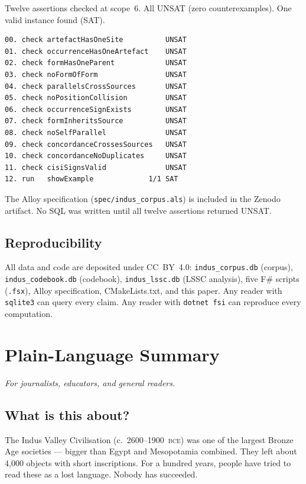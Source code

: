 Twelve assertions checked at scope~6. All UNSAT (zero
counterexamples). One valid instance found (SAT).

{\small
\begin{verbatim}
00. check artefactHasOneSite          UNSAT
01. check occurrenceHasOneArtefact    UNSAT
02. check formHasOneParent            UNSAT
03. check noFormOfForm                UNSAT
04. check parallelsCrossSources       UNSAT
05. check noPositionCollision         UNSAT
06. check occurrenceSignExists        UNSAT
07. check formInheritsSource          UNSAT
08. check noSelfParallel              UNSAT
09. check concordanceCrossesSources   UNSAT
10. check concordanceNoDuplicates     UNSAT
11. check cisiSignsValid              UNSAT
12. run   showExample             1/1 SAT
\end{verbatim}
}

\noindent
The Alloy specification (\texttt{spec/indus\_corpus.als}) is
included in the Zenodo artifact. No SQL was written until all
twelve assertions returned UNSAT.

\subsection{Reproducibility}

All data and code are deposited under CC~BY~4.0:
\texttt{indus\_corpus.db} (corpus),
\texttt{indus\_codebook.db} (codebook),
\texttt{indus\_lssc.db} (LSSC analysis),
five F\# scripts (\texttt{.fsx}),
Alloy specification, CMakeLists.txt,
and this paper.
Any reader with \texttt{sqlite3} can query every claim.
Any reader with \texttt{dotnet fsi} can reproduce every
computation.

\clearpage
\section{Plain-Language Summary}

\textit{For journalists, educators, and general readers.}

\subsection{What is this about?}

The Indus Valley Civilisation (c.\ 2600--1900~\textsc{bce}) was
one of the largest Bronze Age societies --- bigger than Egypt and
Mesopotamia combined. They left about 4{,}000 objects with short
inscriptions. For a hundred years, people have tried to read these
as a lost language. Nobody has succeeded.

